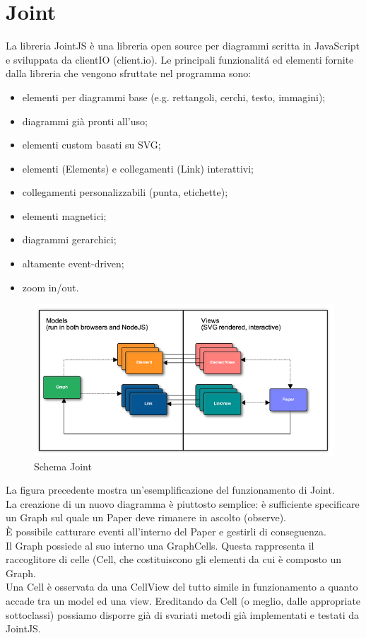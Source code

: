 \documentclass[../SpecificaTecnica.tex]{subfiles}
\begin{document}
	\section{Joint}
La libreria JointJS è una libreria open source per diagrammi scritta in JavaScript e sviluppata
da clientIO (client.io).
Le principali funzionalit\'a ed elementi fornite dalla libreria che vengono sfruttate nel programma sono:
\begin{itemize}
\item elementi per diagrammi base (e.g. rettangoli, cerchi, testo, immagini);
\item diagrammi già pronti all’uso;
\item elementi custom basati su SVG;
\item elementi (Elements) e collegamenti (Link) interattivi;
\item collegamenti personalizzabili (punta, etichette);
\item elementi magnetici;
\item diagrammi gerarchici;
\item altamente event-driven;
\item zoom in/out.
\end{itemize}

\begin{figure}[H] \label{fig:Joint}
	\centering
	\includegraphics[scale=1]{Immagini/joint.png}
	\caption{Schema Joint}
\end{figure}

La figura precedente mostra un'esemplificazione del funzionamento di Joint.\\
La creazione di un nuovo diagramma è piuttosto semplice: è sufficiente specificare un Graph sul quale un Paper deve rimanere in ascolto (observe).\\
È possibile catturare eventi all’interno del Paper e gestirli di conseguenza.\\
Il Graph possiede al suo interno una GraphCells. Questa rappresenta il raccoglitore di celle (Cell, che costituiscono gli elementi da cui è composto un Graph.\\
Una Cell è osservata da una CellView del tutto simile in funzionamento a quanto accade tra un model ed una view.
Ereditando da Cell (o meglio, dalle appropriate sottoclassi) possiamo disporre già di svariati metodi già implementati e testati da JointJS.
\end{document}
